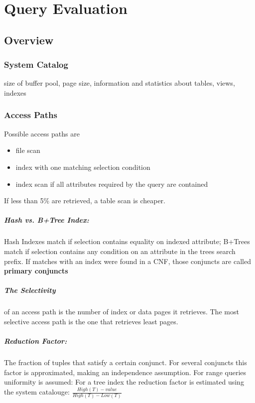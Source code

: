\chapter{Query Evaluation}

\section{Overview}
\subsection{System Catalog}
 size of buffer pool, page size, information and statistics about tables, views, indexes

\subsection{Access Paths}
Possible access paths are 
\begin{itemize}
    \item file scan
    \item index with one matching selection condition
    \item index scan  if all attributes required by the query are contained
\end{itemize}
If less than 5\% are retrieved, a table scan is cheaper.

\paragraph{Hash vs. B+Tree Index:} Hash Indexes match if selection contains equality on indexed attribute; B+Trees match if selection contains any condition on an attribute in the trees search prefix. If matches with an index were found in a CNF, those conjuncts are called \textbf{primary conjuncts} \\

\paragraph{The Selectivity} of an access path is the number of index or data pages it retrieves. The most selective access path is the one that retrieves least pages. \\

\paragraph{Reduction Factor:} The fraction of tuples that satisfy a certain conjunct. For several conjuncts this factor is approximated, making an independence assumption. For range queries uniformity is assumed: For a tree index the reduction factor is estimated using the system catalouge: $\frac{High(T)- value}{High(T)- Low(T)}$ \\

